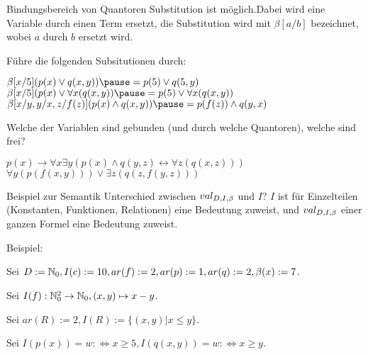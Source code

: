 \begin{frame}{Bindungsbereich von Quantoren}
	Substitution ist möglich.\ip Dabei wird eine  Variable durch einen Term ersetzt, die Substitution wird mit $\beta[a/b]$ bezeichnet, wobei $a$ durch $b$ ersetzt wird.
	
	\vertspace
	
	
	\bp
	
	Führe die folgenden Subsitutionen durch:
	\begin{itemize}
		\pitem $\beta[x/5] (p(x) \lor q(x,y)) \pause = p(5) \lor q(5,y)$
		\pitem $\beta[x/5] (p(x) \lor \forall x (q(x,y)) \pause = p(5) \lor \forall x (q(x,y))$
		\pitem $\beta[x/y, y/x, z/f(z)] (p(x) \land q(x,y)) \pause = p(f(z)) \land q(y,x)$
	\end{itemize}

	\vertspace
	
	\bp
	
	Welche der Variablen sind gebunden (und durch welche Quantoren), welche sind frei? 
	\begin{itemize}
		\pitem $p(x) \rightarrow \forall x \exists y (p(x) \land q(y,z) \leftrightarrow \forall z (q(x,z)))$
		\pitem $\forall y(p(f(x,y))) \lor \exists z(q(z,f(y,z)))$
	\end{itemize}

\end{frame}

\begin{frame}{Beispiel zur Semantik}
	Unterschied zwischen $val_{D,I,\beta}$ und $I$? \pause $I$ ist für Einzelteilen (Konstanten, Funktionen, Relationen) eine Bedeutung zuweist, und $val_{D,I,\beta}$ einer ganzen Formel eine Bedeutung zuweist.\pause\vertspace
	
	Beispiel:\vertspace\ip
	
	Sei $D := \mathbb{N}_0, I(c) := 10, ar(f) := 2, ar(p) := 1, ar(q) := 2, \beta(x) := 7$.\ip
	
	Sei $I(f) : \mathbb{N}_0^2 \rightarrow \mathbb{N}_0, (x,y) \mapsto x-y$.\ip
	
	Sei $ar(R) := 2, I(R) := \{(x,y) | x \leq y\}$.\ip
	
	Sei $I(p(x)) = w :\Leftrightarrow x \geq 5, I(q(x,y)) = w :\Leftrightarrow x \geq y$.
\end{frame}

